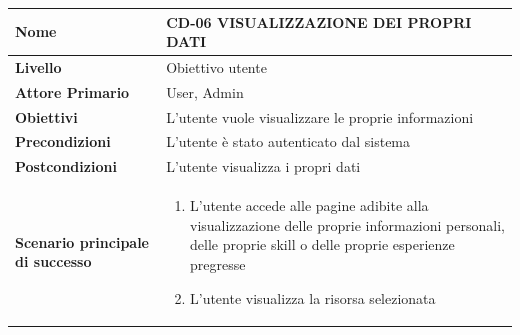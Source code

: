 \begin{center}
    \begin{tabular}{|p{0.3\linewidth}|p{0.7\linewidth}|}
    \hline
    \rowcolor{Blue}
    \textbf{Nome} & CD-06 VISUALIZZAZIONE DEI PROPRI DATI \\
    \hline
    \rowcolor{DarkBlue}
    \textbf{Livello} & Obiettivo utente \\
    \hline
    \rowcolor{LightBlue}
    \textbf{Attore Primario} & User, Admin \\
    \hline
    \rowcolor{LightBlue}
    \textbf{Obiettivi} & L’utente vuole visualizzare le proprie informazioni \\
    \hline
    \rowcolor{Blue}
    \textbf{Precondizioni} & L’utente è stato autenticato dal sistema \\
    \hline
    \rowcolor{LightBlue}
    \textbf{Postcondizioni} & L’utente visualizza i propri dati \\
    \hline
    \rowcolor{LighterBlue}
        \begin{center}
        \textbf{Scenario principale di successo}
    \end{center} 
    & 
    \begin{enumerate}
        \item L’utente accede alle pagine adibite alla visualizzazione delle proprie informazioni personali, delle proprie skill o delle proprie esperienze pregresse
        \item L’utente visualizza la risorsa selezionata
    \end{enumerate}
    \\
    \hline
    \end{tabular}
\end{center}

